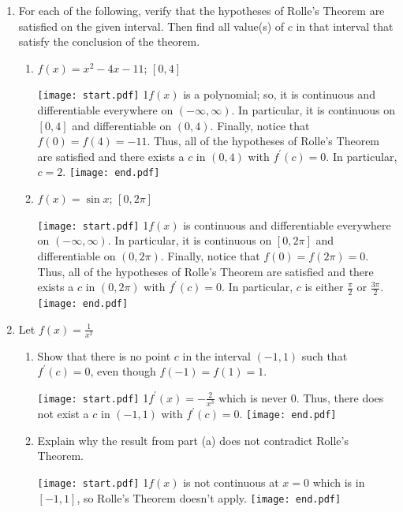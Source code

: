 \documentclass[12pt]{article}
\begin{document}
\begin{enumerate}

\item For each of the following, verify that the hypotheses of Rolle's Theorem are satisfied on the given interval. Then find all value(s) of $c$ in that interval that satisfy the conclusion of the theorem.

\begin{enumerate}

\item $f(x)=x^2-4x-11$; $[0,4]$

\texttt{[image: start.pdf]}
{{{1\linewidth}{$f(x)$ is a polynomial; so, it is continuous and differentiable everywhere on $(-\infty,\infty)$.  In particular, it is continuous on $[0,4]$ and differentiable on $(0,4)$.  Finally, notice that $f(0)=f(4)=-11$.  Thus, all of the hypotheses of Rolle's Theorem are satisfied and there exists a $c$ in $(0,4)$ with $f^{\prime}(c)=0$.  In particular, $c=2$.}}}
\texttt{[image: end.pdf]}


\item $f(x)=\sin{x}$; $[0,2\pi]$

\texttt{[image: start.pdf]}
{{{1\linewidth}{$f(x)$ is continuous and differentiable everywhere on $(-\infty,\infty)$.  In particular, it is continuous on $[0,2\pi]$ and differentiable on $(0,2\pi)$.  Finally, notice that $f(0)=f(2\pi)=0$.  Thus, all of the hypotheses of Rolle's Theorem are satisfied and there exists a $c$ in $(0,2\pi)$ with $f^{\prime}(c)=0$.  In particular, $c$ is either $\frac{\pi}{2}$ or $\frac{3\pi}{2}$.}}}
\texttt{[image: end.pdf]}


\end{enumerate}

\item Let $f(x)=\frac{1}{x^2}$

\begin{enumerate}

\item Show that there is no point $c$ in the interval $(-1,1)$ such that $f^{\prime}(c)=0$, even though $f(-1)=f(1)=1$.

\texttt{[image: start.pdf]}
{{{1\linewidth}{$f^{\prime}(x)=-\frac{2}{x^3}$ which is never 0.  Thus, there does not exist a $c$ in $(-1,1)$ with $f^{\prime}(c)=0$.}}}
\texttt{[image: end.pdf]}


\item Explain why the result from part (a) does not contradict Rolle's Theorem.

\texttt{[image: start.pdf]}
{{{1\linewidth}{$f(x)$ is not continuous at $x=0$ which is in $[-1,1]$, so Rolle's Theorem doesn't apply.}} }
\texttt{[image: end.pdf]}



\end{enumerate}
\end{enumerate}
\end{document}
